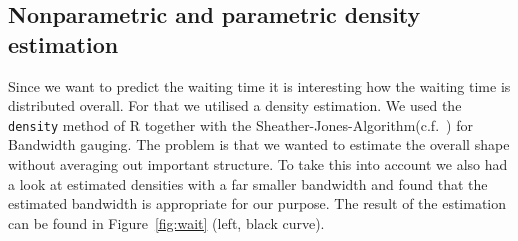 \documentclass[english,final]{scrartcl}
\begin{document}
\subsection{Nonparametric and parametric density estimation}
\label{sec:density}

Since we want to predict the waiting time it is interesting how the waiting time is distributed overall. For that we utilised a density estimation. We used the \texttt{density} method of R together with the Sheather-Jones-Algorithm(c.f.~\cite{sj}) for Bandwidth gauging. The problem is that we wanted to estimate the overall shape without averaging out important structure. To take this into account we also had a look at estimated densities with a far smaller bandwidth and found that the estimated bandwidth is appropriate for our purpose. The result of the estimation can be found in Figure~\ref{fig:wait} (left, black curve). 
\end{document}
